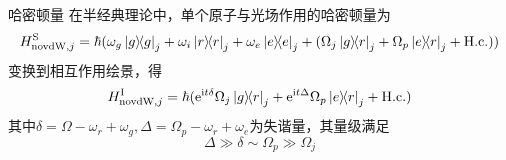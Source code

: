 \documentclass[10pt,aspectratio=43]{beamer}
\begin{document}
\begin{frame}{哈密顿量}
在半经典理论中，单个原子与光场作用的哈密顿量为
\begin{equation}
H_{\mathrm{novdW},j}^\mathrm{S}=\hbar(\omega_g\ketbra{g}{g}_j+\omega_i\ketbra{r}{r}_j+\omega_e\ketbra{e}{e}_j+(\Omega_j\ketbra{g}{r}_j+\Omega_p\ketbra{e}{r}_j+\mathrm{H.c.}))
\end{equation}
变换到相互作用绘景，得
\begin{equation}\label{}
H_{\mathrm{novdW},j}^\mathrm{I}=\hbar(\mathrm{e}^{\mathrm{i}t\delta}\Omega_j\ketbra{g}{r}_j+\mathrm{e}^{\mathrm{i}t\Delta}\Omega_p\ketbra{e}{r}_j+\mathrm{H.c.})
\end{equation}
其中$ \delta=\Omega-\omega_r+\omega_g,\Delta=\Omega_p-\omega_r+\omega_e
 $为失谐量，其量级满足
\begin{equation}
\Delta\gg\delta\sim\Omega_p\gg\Omega_j
\end{equation}
\end{frame}
\end{document}
